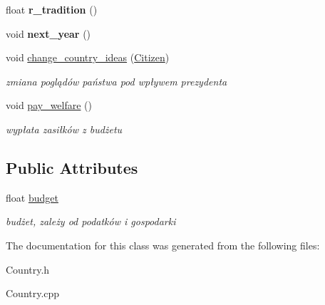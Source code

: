 \begin{DoxyCompactItemize}
\item 
\hypertarget{classCountry_ae9933daa5af50feed6e75864a64b5904}{float {\bfseries r\+\_\+tradition} ()}\label{classCountry_ae9933daa5af50feed6e75864a64b5904}

\item 
\hypertarget{classCountry_af47ff261b0835fe487aef92491975566}{void {\bfseries next\+\_\+year} ()}\label{classCountry_af47ff261b0835fe487aef92491975566}

\item 
\hypertarget{classCountry_a7beb62e8f51ed611fe34bb54f8ca84a7}{void \hyperlink{classCountry_a7beb62e8f51ed611fe34bb54f8ca84a7}{change\+\_\+country\+\_\+ideas} (\hyperlink{classCitizen}{Citizen})}\label{classCountry_a7beb62e8f51ed611fe34bb54f8ca84a7}

\begin{DoxyCompactList}\small\item\em zmiana poglądów państwa pod wpływem prezydenta \end{DoxyCompactList}\item 
\hypertarget{classCountry_ade5a82afc70bc8c751949dacdae5d0ac}{void \hyperlink{classCountry_ade5a82afc70bc8c751949dacdae5d0ac}{pay\+\_\+welfare} ()}\label{classCountry_ade5a82afc70bc8c751949dacdae5d0ac}

\begin{DoxyCompactList}\small\item\em wypłata zasiłków z budżetu \end{DoxyCompactList}\end{DoxyCompactItemize}
\subsection*{Public Attributes}
\begin{DoxyCompactItemize}
\item 
\hypertarget{classCountry_a1db56101d06cc97b2be2a68607f4ac48}{float \hyperlink{classCountry_a1db56101d06cc97b2be2a68607f4ac48}{budget}}\label{classCountry_a1db56101d06cc97b2be2a68607f4ac48}

\begin{DoxyCompactList}\small\item\em budżet, zależy od podatków i gospodarki \end{DoxyCompactList}\end{DoxyCompactItemize}


The documentation for this class was generated from the following files\+:\begin{DoxyCompactItemize}
\item 
Country.\+h\item 
Country.\+cpp\end{DoxyCompactItemize}
